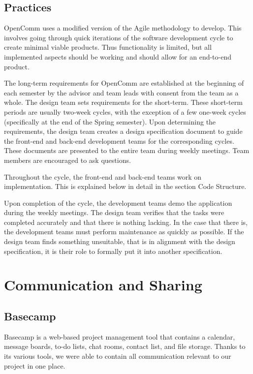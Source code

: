 \documentclass[12pt, letterpaper]{article}
\begin{document}
\subsection{Practices}
OpenComm uses a modified version of the Agile methodology to develop.  This involves going through quick iterations of the software development cycle to create minimal viable products.  Thus functionality is limited, but all implemented aspects should be working and should allow for an end-to-end product.  

The long-term requirements for OpenComm are established at the beginning of each semester by the advisor and team leads with consent from the team as a whole.  The design team sets requirements for the short-term.  These short-term periods are usually two-week cycles, with the exception of a few one-week cycles (specifically at the end of the Spring semester).  Upon determining the requirements, the design team creates a design specification document to guide the front-end and back-end development teams for the corresponding cycles.  These documents are presented to the entire team during weekly meetings.  Team members are encouraged to ask questions.  

Throughout the cycle, the front-end and back-end teams work on implementation.  This is explained below in detail in the section Code Structure.  

Upon completion of the cycle, the development teams demo the application during the weekly meetings.  The design team verifies that the tasks were completed accurately and that there is nothing lacking.  In the case that there is, the development teams must perform maintenance as quickly as possible.  If the design team finds something unsuitable, that is in alignment with the design specification, it is their role to formally put it into another specification.  

\section{Communication and Sharing}

\subsection{Basecamp}
Basecamp is a web-based project management tool that contains a calendar, message boards, to-do lists, chat rooms, contact list, and file storage. Thanks to its various tools, we were able to contain all communication relevant to our project in one place.
\end{document}

